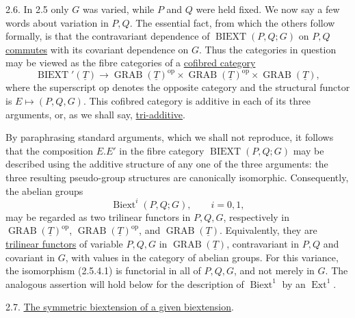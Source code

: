
2.6. In 2.5 only $G$ was varied, while $P$ and $Q$ were held fixed.
We now say a few words about variation in $P,Q$. The essential fact,
from which the others follow formally, is that the contravariant
dependence of $\operatorname{BIEXT}(P,Q;G)$ on $P,Q$
\underline{commutes} with its covariant dependence on $G$. Thus the
categories in question may be viewed as the fibre categories of a
\underline{cofibred category}
\begin{equation}\tag{2.6.1}
 \operatorname{BIEXT}'(\underline T)
 \longrightarrow
 \operatorname{GRAB}(\underline T)^{\mathrm{op}}\times
 \operatorname{GRAB}(\underline T)^{\mathrm{op}}\times
 \operatorname{GRAB}(\underline T),
\end{equation}
where the superscript $\mathrm{op}$ denotes the opposite category and
the structural functor is $E\mapsto(P,Q,G)$. This cofibred category is
additive in each of its three arguments, or, as we shall say,
\underline{tri-additive}.

By paraphrasing standard arguments, which we shall not reproduce, it
follows that the composition $E.E'$ in the fibre category
$\operatorname{BIEXT}(P,Q;G)$ may be described using the additive
structure of any one of the three arguments: the three resulting
pseudo-group structures are canonically isomorphic. Consequently, the
abelian groups
\begin{equation}\tag{2.6.2}
 \operatorname{Biext}^{i}(P,Q;G),\qquad i=0,1,
\end{equation}
may be regarded as two trilinear functors in $P,Q,G$, respectively in
$\operatorname{GRAB}(\underline T)^{\mathrm{op}}$,
$\operatorname{GRAB}(\underline T)^{\mathrm{op}}$, and
$\operatorname{GRAB}(\underline T)$. Equivalently, they are
\underline{trilinear functors} of variable $P,Q,G$ in
$\operatorname{GRAB}(\underline T)$, contravariant in $P,Q$ and
covariant in $G$, with values in the category of abelian groups.
For this variance, the isomorphism (2.5.4.1) is functorial in all of
$P,Q,G$, and not merely in $G$. The analogous assertion will hold
below for the description of $\operatorname{Biext}^{1}$ by an
$\operatorname{Ext}^{1}$.

2.7. \underline{The symmetric biextension of a given biextension}.

